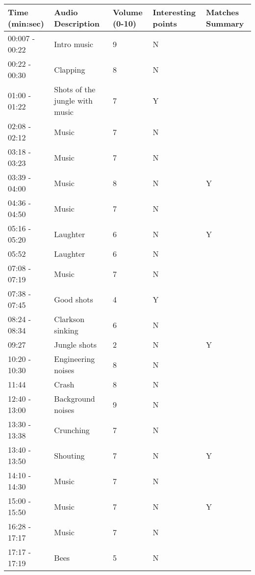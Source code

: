 \begin{longtable}{| p{70pt} | p{130pt} | p{45pt} | p{57pt} | p{60pt}|}
\hline
\textbf{Time (min:sec)} & \textbf{Audio Description} & \textbf{Volume (0-10)} &\textbf{ Interesting points} & \textbf{Matches Summary}\\ \hline
00:007 - 00:22 & Intro music & 9 & N 	& \\\hline
00:22 - 00:30     &     Clapping     &     8      &     N& \\\hline
01:00 - 01:22     &     Shots of the jungle with music     &     7     &     Y& \\\hline
02:08 - 02:12     &     Music     &     7     &     N& \\\hline
03:18 - 03:23     &     Music     &     7     &     N& \\\hline
03:39 - 04:00     &     Music     &     8      &     N& Y \\\hline
04:36 - 04:50     &     Music     &     7     &     N& \\\hline
05:16 - 05:20     &     Laughter     &     6      &     N&Y \\\hline
05:52     		   &     Laughter     &     6     &     N& \\\hline
07:08 - 07:19     &     Music     &     7     &     N& \\\hline
07:38 - 07:45     &     Good shots     &     4     &     Y& \\\hline
08:24 - 08:34     &     Clarkson sinking     &     6     &     N& \\\hline
09:27     	           &     Jungle shots     &     2     &     N&Y \\\hline
10:20 - 10:30     &     Engineering noises     &     8     &     N& \\\hline
11:44     		   &     Crash     &     8     &     N& \\\hline
12:40 - 13:00     &     Background noises     &     9     &     N& \\\hline
13:30 - 13:38     &     Crunching     &     7     &     N& \\\hline
13:40 - 13:50     &     Shouting     &     7     &     N&Y \\\hline
14:10 - 14:30     &     Music     &     7     &     N& \\\hline
15:00 - 15:50     &     Music     &     7     &     N&Y \\\hline
16:28 - 17:17     &     Music     &     7     &     N& \\\hline
17:17 - 17:19     &     Bees     &     5     &     N& \\\hline

\end{longtable}
